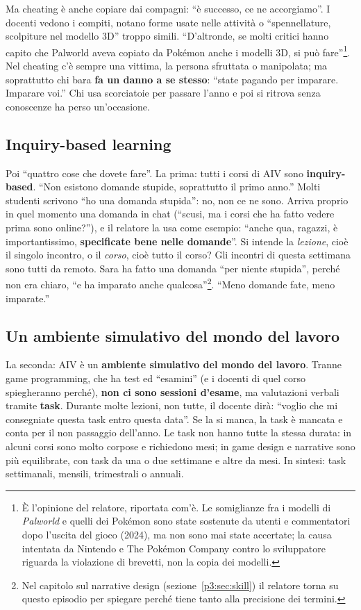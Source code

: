 Ma cheating è anche copiare dai compagni: ``è successo, ce ne accorgiamo''.
I docenti vedono i compiti, notano forme usate nelle attività o
``spennellature, scolpiture nel modello 3D'' troppo simili. ``D'altronde, se
molti critici hanno capito che Palworld aveva copiato da Pokémon anche i
modelli 3D, si può fare''\footnote{È l'opinione del relatore, riportata
com'è. Le somiglianze fra i modelli di \emph{Palworld} e quelli dei Pokémon
sono state sostenute da utenti e commentatori dopo l'uscita del gioco
(2024), ma non sono mai state accertate; la causa intentata da Nintendo e
The Pokémon Company contro lo sviluppatore riguarda la violazione di
brevetti, non la copia dei modelli.}. Nel cheating c'è sempre una vittima,
la persona sfruttata o manipolata; ma soprattutto chi bara \textbf{fa un
danno a se stesso}: ``state pagando per imparare. Imparare voi.'' Chi usa
scorciatoie per passare l'anno e poi si ritrova senza conoscenze ha perso
un'occasione.

\subsection{Inquiry-based learning}

Poi ``quattro cose che dovete fare''. La prima: tutti i corsi di AIV sono
\textbf{inquiry-based}. ``Non esistono domande stupide, soprattutto il primo
anno.'' Molti studenti scrivono ``ho una domanda stupida'': no, non ce ne
sono. Arriva proprio in quel momento una domanda in chat (``scusi, ma i
corsi che ha fatto vedere prima sono online?''), e il relatore la usa come
esempio: ``anche qua, ragazzi, è importantissimo, \textbf{specificate bene
nelle domande}''. Si intende la \emph{lezione}, cioè il singolo incontro, o
il \emph{corso}, cioè tutto il corso? Gli incontri di questa settimana sono
tutti da remoto. Sara ha fatto una domanda ``per niente stupida'', perché
non era chiaro, ``e ha imparato anche qualcosa''\footnote{Nel capitolo sul
narrative design (sezione~\ref{p3:sec:skill}) il relatore torna su questo
episodio per spiegare perché tiene tanto alla precisione dei termini.}.
``Meno domande fate, meno imparate.''

\subsection{Un ambiente simulativo del mondo del lavoro}

La seconda: AIV è un \textbf{ambiente simulativo del mondo del lavoro}.
Tranne game programming, che ha test ed ``esamini'' (e i docenti di quel corso
spiegheranno perché), \textbf{non ci sono sessioni d'esame}, ma valutazioni
verbali tramite \textbf{task}. Durante molte lezioni, non tutte, il docente
dirà: ``voglio che mi consegniate questa task entro questa data''. Se la si
manca, la task è mancata e conta per il non passaggio dell'anno. Le task non
hanno tutte la stessa durata: in alcuni corsi sono molto corpose e
richiedono mesi; in game design e narrative sono più equilibrate, con task
da una o due settimane e altre da mesi. In sintesi: task settimanali,
mensili, trimestrali o annuali.

